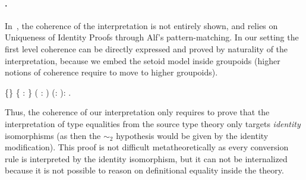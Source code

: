 \paragraph{.}
  In~\cite{dybjer:internaltt}, the coherence of the interpretation is
  not entirely shown, and relies on Uniqueness of Identity Proofs through
  Alf's pattern-matching. In our setting the first level coherence can
  be directly expressed and proved by naturality of the interpretation,
  because we embed the setoid model inside groupoids (higher notions of coherence
  require to move to higher groupoids).  \begin{coqdoccode}
\coqdocemptyline
\coqdocnoindent
{}  \{\} \{ : \} (  :   ) (: ):\coqdoceol
\coqdocindent{1.00em}
          .\coqdoceol
\end{coqdoccode}
Thus, the coherence of our interpretation only requires to prove 
  that the interpretation of type equalities from the source type theory 
  only targets \textit{identity} isomorphisms (as then the  $\sim_2$  hypothesis would be given by 
  the identity modification). This proof is not difficult metatheoretically as every 
  conversion rule is interpreted by the identity isomorphism, but it can not be 
  internalized because it is not possible to reason on definitional equality inside 
  the theory.
 \begin{coqdoccode}
\end{coqdoccode}
